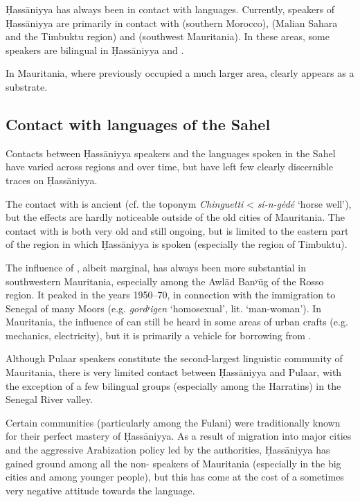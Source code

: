 \documentclass[output=paper]{langsci/langscibook}
\begin{document}
Ḥassāniyya has always been in contact with  languages. Currently, speakers of Ḥassāniyya are primarily in contact with  (southern Morocco),  (Malian Sahara and the Timbuktu region) and  (southwest Mauritania). In these areas, some speakers are bilingual in Ḥassāniyya and . 

In Mauritania, where  previously occupied a much larger area,  clearly appears as a {substrate}.

\subsection{Contact with languages of the Sahel} %

Contacts between Ḥassāniyya speakers and the languages spoken in the Sahel have varied across regions and over time, but have left few clearly discernible traces on Ḥassāniyya.

The contact with  is ancient (cf. the toponym \textit{Chinguetti} <  \textit{sí-n-gèdé} ‘horse well’), but the effects are hardly noticeable outside of the old cities of Mauritania. The contact with  is both very old and still ongoing, but is limited to the eastern part of the region in which Ḥassāniyya is spoken (especially the region of Timbuktu).

The influence of , albeit marginal, has always been more substantial in southwestern Mauritania, especially among the Awlād Banʸūg of the Rosso region. It peaked in the years 1950–70, in connection with the immigration to Senegal of many Moors (e.g. \textit{gordʸigen} ‘homosexual’, lit. ‘man-woman’). In Mauritania, the influence of  can still be heard in some areas of urban crafts (e.g. mechanics, electricity), but it is primarily a vehicle for borrowing from .

Although Pulaar speakers constitute the second-largest linguistic community of Mauritania, there is very limited contact between Ḥassāniyya and Pulaar, with the exception of a few bilingual groups (especially among the Harratins) in the Senegal River valley.

Certain communities (particularly among the Fulani) were traditionally known for their perfect mastery of Ḥassāniyya. As a result of migration into major cities and the aggressive {Arabization} policy led by the authorities, Ḥassāniyya has gained ground among all the non- speakers of Mauritania (especially in the big cities and among younger people), but this has come at the cost of a sometimes very negative attitude towards the language. 
\end{document}
